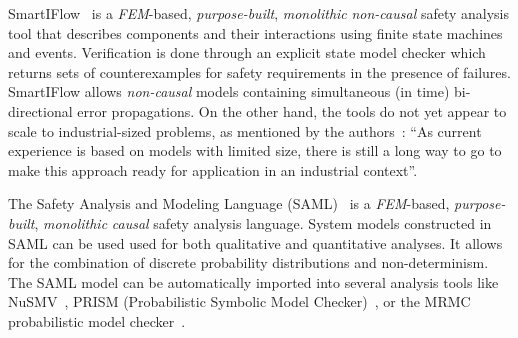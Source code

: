 
SmartIFlow~\cite{info8010007} is a {\em FEM}-based, {\em purpose-built}, {\em monolithic} {\em non-causal} safety analysis tool that describes components and their interactions using finite state machines and events. Verification is done through an explicit state model checker which returns sets of counterexamples for safety requirements in the presence of failures.  SmartIFlow allows {\em non-causal} models containing simultaneous (in time) bi-directional %
error propagations.  On the other hand, the tools do not yet appear to scale to industrial-sized problems, as mentioned by the authors~\cite{info8010007}: ``As current experience is based on models with limited size, there is still a long way to go to make this approach ready for application in an industrial context''.


The Safety Analysis and Modeling Language (SAML)~\cite{Gudemann:2010:FQQ:1909626.1909813} is a {\em FEM}-based, {\em purpose-built}, {\em monolithic} {\em causal} safety analysis language.  System models constructed in SAML can be used used for both qualitative and quantitative analyses. It allows for the combination of discrete probability distributions and non-determinism. The SAML model can be automatically imported into several analysis tools like NuSMV~\cite{Cimatti2000}, PRISM (Probabilistic Symbolic Model Checker)~\cite{CAV2011:KwNoPa}, or the MRMC probabilistic model checker~\cite{Katoen:2005:MRM:1114692.1115230}. 



